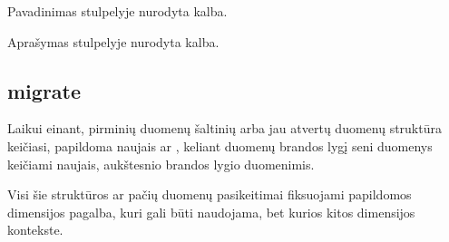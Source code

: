 \documentclass[letterpaper,10pt,lithuanian]{sphinxmanual}
\begin{document}

\begin{fulllineitems}
\label{\detokenize{dimensijos:lang.title}}
\pysigstartsignatures
\pysigline
{}
\pysigstopsignatures
\sphinxAtStartPar
Pavadinimas {\hyperref[\detokenize{dimensijos:lang.ref}]{}} stulpelyje nurodyta kalba.

\end{fulllineitems}


\begin{fulllineitems}
\label{\detokenize{dimensijos:lang.description}}
\pysigstartsignatures
\pysigline
{}
\pysigstopsignatures
\sphinxAtStartPar
Aprašymas {\hyperref[\detokenize{dimensijos:lang.ref}]{}} stulpelyje nurodyta kalba.

\end{fulllineitems}



\subsection{migrate}
\label{\detokenize{dimensijos:migrate}}\label{\detokenize{dimensijos:id16}}\label{\detokenize{dimensijos:module-migrate}}
\sphinxAtStartPar
{}

\sphinxAtStartPar
Laikui einant, pirminių duomenų šaltinių arba jau atvertų duomenų struktūra
keičiasi, papildoma naujais {\hyperref[\detokenize{savokos:term-modelis}]{}} ar {\hyperref[\detokenize{savokos:term-savybe}]{}}, keliant duomenų brandos lygį seni duomenys keičiami naujais,
aukštesnio brandos lygio duomenimis.

\sphinxAtStartPar
Visi šie struktūros ar pačių duomenų pasikeitimai fiksuojami papildomos
{\hyperref[\detokenize{dimensijos:module-migrate}]{}} dimensijos pagalba, kuri gali būti naudojama, bet kurios kitos
dimensijos kontekste.
\end{document}
